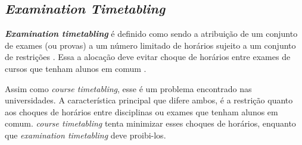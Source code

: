 \subsection{\textit{Examination Timetabling}}

\textbf{\textit{Examination timetabling}} é definido como sendo a atribuição de um conjunto de exames (ou provas) a um número limitado de horários sujeito a um conjunto de restrições \cite{yang2004novel}. Essa a alocação deve evitar choque de horários entre exames de cursos que tenham alunos em comum \cite{schaerf1999survey}.

Assim como \textit{course timetabling}, esse é um problema encontrado nas universidades. A característica principal que difere ambos, é a restrição quanto aos choques de horários entre disciplinas ou exames que tenham alunos em comum. \textit{course timetabling} tenta minimizar esses choques de horários, enquanto que \textit{examination timetabling} deve proibi-los.